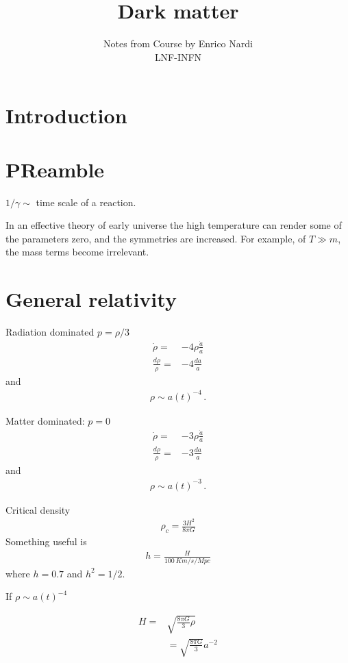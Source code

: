 \documentclass[12pt,letterpaper]{article}
\title{Dark matter}
\author{Notes from Course by Enrico Nardi\\ LNF-INFN}
\begin{document}
\maketitle

\section{Introduction}

\section{PReamble}
$1/\gamma\sim$ time scale of a reaction.

In an effective theory of early universe the high temperature can render some of the parameters zero, and the symmetries are increased. For example, of $T\gg m$, the mass terms become irrelevant.


\section{General relativity}
Radiation dominated $p=\rho/3$
\begin{align*}
  \dot\rho=&-4\rho\frac{\dot{a}}{a}\nonumber\\
  \frac{d\rho}{\rho}=&-4\frac{da}{a}
\end{align*}
and
\begin{align*}
  \rho\sim a(t)^{-4}\,.
\end{align*}

Matter dominated: $p=0$
\begin{align*}
  \dot{\rho}=&-3\rho\frac{\dot{a}}{a}\nonumber\\
  \frac{d\rho}{\rho}=&-3\frac{da}{a}
\end{align*}
and
\begin{align*}
  \rho\sim a(t)^{-3}\,.
\end{align*}

Critical density
\begin{align*}
  \rho_c=\frac{3H^2}{8\pi G}
\end{align*}
Something useful is
\begin{align*}
  h=\frac{H}{\SI{100}{Km/s/Mpc}}
\end{align*}
where $h=0.7$ and $h^2=1/2$.

If  $ \rho\sim a(t)^{-4}$

\begin{align*}
  H=&\sqrt{\frac{8\pi G}{3}\rho}\nonumber\\
&=\sqrt{\frac{8\pi G}{3}}a^{-2}
\end{align*}
\end{document}
